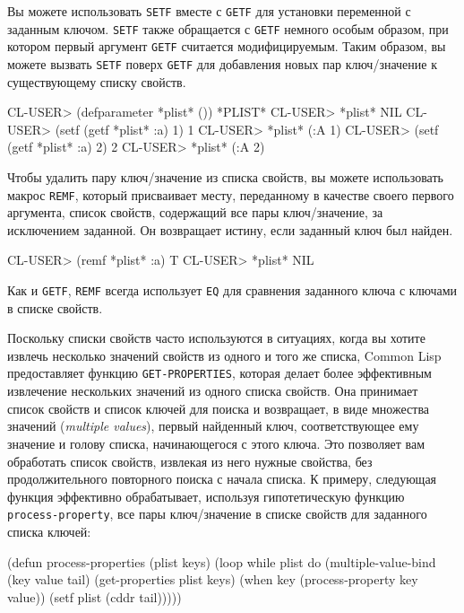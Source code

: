 Вы можете использовать \lstinline{SETF} вместе с \lstinline{GETF} для установки переменной с
заданным ключом. \lstinline{SETF} также обращается с \lstinline{GETF} немного особым образом, при
котором первый аргумент \lstinline{GETF} считается модифицируемым. Таким образом, вы можете
вызвать \lstinline{SETF} поверх \lstinline{GETF} для добавления новых пар ключ/значение к
существующему списку свойств.
  
\begin{myverb}
CL-USER> (defparameter *plist* ())
*PLIST*
CL-USER> *plist*
NIL
CL-USER> (setf (getf *plist* :a) 1)
1
CL-USER> *plist*
(:A 1)
CL-USER> (setf (getf *plist* :a) 2)
2
CL-USER> *plist*
(:A 2)
\end{myverb}

Чтобы удалить пару ключ/значение из списка свойств, вы можете использовать макрос
\lstinline{REMF}, который присваивает месту, переданному в качестве своего первого аргумента,
список свойств, содержащий все пары ключ/значение, за исключением заданной. Он возвращает
истину, если заданный ключ был найден.
  
\begin{myverb}
CL-USER> (remf *plist* :a)
T
CL-USER> *plist*
NIL
\end{myverb}

Как и \lstinline{GETF}, \lstinline{REMF} всегда использует \lstinline{EQ} для сравнения заданного ключа с
ключами в списке свойств.

Поскольку списки свойств часто используются в ситуациях, когда вы хотите извлечь несколько
значений свойств из одного и того же списка, Common Lisp предоставляет функцию
\lstinline{GET-PROPERTIES}, которая делает более эффективным извлечение нескольких значений из
одного списка свойств. Она принимает список свойств и список ключей для поиска и
возвращает, в виде множества значений (\textit{multiple values}), первый найденный ключ,
соответствующее ему значение и голову списка, начинающегося с этого ключа. Это позволяет
вам обработать список свойств, извлекая из него нужные свойства, без продолжительного
повторного поиска с начала списка.  К примеру, следующая функция эффективно обрабатывает,
используя гипотетическую функцию \lstinline{process-property}, все пары ключ/значение в списке
свойств для заданного списка ключей:

\begin{myverb}
(defun process-properties (plist keys)
  (loop while plist do
	(multiple-value-bind (key value tail) (get-properties plist keys)
	  (when key (process-property key value))
	  (setf plist (cddr tail)))))
\end{myverb}

